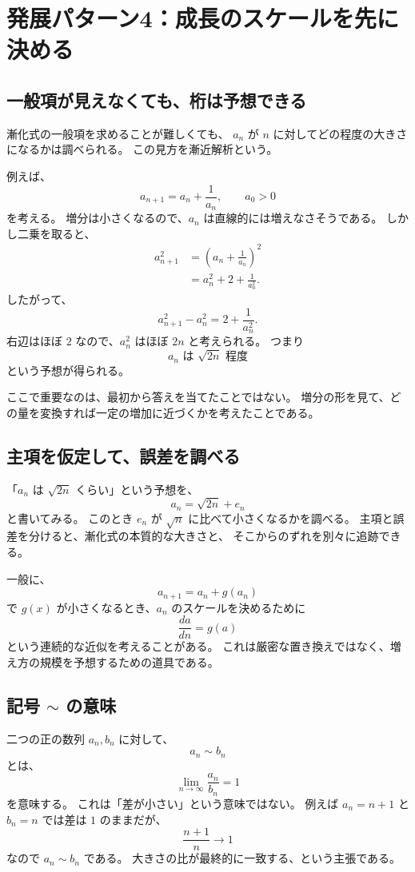 \section{発展パターン4：成長のスケールを先に決める}

\subsection{一般項が見えなくても、桁は予想できる}

漸化式の一般項を求めることが難しくても、
$a_n$ が $n$ に対してどの程度の大きさになるかは調べられる。
この見方を漸近解析という。

例えば、
\[
  a_{n+1}=a_n+\frac1{a_n},\qquad a_0>0
\]
を考える。
増分は小さくなるので、$a_n$ は直線的には増えなさそうである。
しかし二乗を取ると、
\[
\begin{aligned}
  a_{n+1}^2
  &=\left(a_n+\frac1{a_n}\right)^2\\
  &=a_n^2+2+\frac1{a_n^2}.
\end{aligned}
\]
したがって、
\[
  a_{n+1}^2-a_n^2=2+\frac1{a_n^2}.
\]
右辺はほぼ $2$ なので、$a_n^2$ はほぼ $2n$ と考えられる。
つまり
\[
  a_n\text{ は }\sqrt{2n}\text{ 程度}
\]
という予想が得られる。

ここで重要なのは、最初から答えを当てたことではない。
増分の形を見て、どの量を変換すれば一定の増加に近づくかを考えたことである。

\subsection{主項を仮定して、誤差を調べる}

「$a_n$ は $\sqrt{2n}$ くらい」という予想を、
\[
  a_n=\sqrt{2n}+e_n
\]
と書いてみる。
このとき $e_n$ が $\sqrt{n}$ に比べて小さくなるかを調べる。
主項と誤差を分けると、漸化式の本質的な大きさと、
そこからのずれを別々に追跡できる。

一般に、
\[
  a_{n+1}=a_n+g(a_n)
\]
で $g(x)$ が小さくなるとき、$a_n$ のスケールを決めるために
\[
  \frac{da}{dn}=g(a)
\]
という連続的な近似を考えることがある。
これは厳密な置き換えではなく、増え方の規模を予想するための道具である。

\subsection{記号 $\sim$ の意味}

二つの正の数列 $a_n,b_n$ に対して、
\[
  a_n\sim b_n
\]
とは、
\[
  \lim_{n\to\infty}\frac{a_n}{b_n}=1
\]
を意味する。
これは「差が小さい」という意味ではない。
例えば $a_n=n+1$ と $b_n=n$ では差は $1$ のままだが、
\[
  \frac{n+1}{n}\longrightarrow1
\]
なので $a_n\sim b_n$ である。
大きさの比が最終的に一致する、という主張である。

